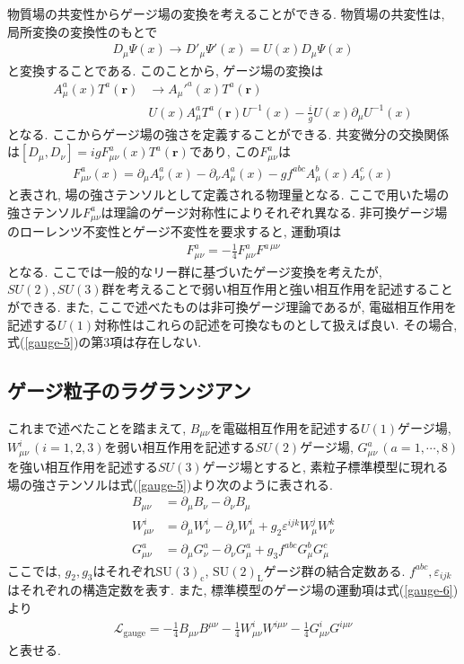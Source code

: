 物質場の共変性からゲージ場の変換を考えることができる.
物質場の共変性は, 局所変換の変換性のもとで
\begin{align}
  D_\mu\Psi(x) \rightarrow D'_\mu \Psi'(x) = U(x) D_\mu \Psi(x)\label{gauge-3}
\end{align}
と変換することである.
このことから, ゲージ場の変換は
\begin{align}
   A_\mu^a(x) T^a(\bm{r}) &\rightarrow A_\mu'^a(x) T^a(\bm{r})\nonumber\\
                          & U(x)A_\mu^a T^a(\bm{r}) U^{-1}(x) -\frac{i}{g}U(x)\partial_\mu U^{-1}(x) \label{gauge-4}
\end{align}
となる.
ここからゲージ場の強さを定義することができる.
共変微分の交換関係は$[D_\mu,D_\nu] = igF_{\mu\nu}^a(x)T^a(\bm{r})$であり, この$F_{\mu\nu}^a$は
\begin{align}
  F_{\mu\nu}^a(x) = \partial_\mu A_\nu^a(x) - \partial_\nu A_\mu^a(x) - gf^{abc}A_\mu^b(x)A_\nu^c(x)\label{gauge-5}
\end{align}
と表され, 場の強さテンソルとして定義される物理量となる.
ここで用いた場の強さテンソル$F_{\mu\nu}^a$は理論のゲージ対称性によりそれぞれ異なる.
非可換ゲージ場のローレンツ不変性とゲージ不変性を要求すると, 運動項は
\begin{align}
  F_{\mu\nu}^a = -\frac{1}{4}F_{\mu\nu}^a F^{a\,\mu\nu}\label{gauge-6}
\end{align}
となる.
ここでは一般的なリー群に基づいたゲージ変換を考えたが, $SU(2), SU(3)$群を考えることで弱い相互作用と強い相互作用を記述することができる.
また, ここで述べたものは非可換ゲージ理論であるが, 電磁相互作用を記述する$U(1)$対称性はこれらの記述を可換なものとして扱えば良い.
その場合, 式(\ref{gauge-5})の第3項は存在しない.
\subsection{ゲージ粒子のラグランジアン}
これまで述べたことを踏まえて, $B_{\mu\nu}$を電磁相互作用を記述する$U(1)$ゲージ場, $W_{\mu\nu}^i\,(i=1,2,3)$を弱い相互作用を記述する$SU(2)$ゲージ場, $G_{\mu\nu}^a\,(a=1,\cdots,8)$を強い相互作用を記述する$SU(3)$ゲージ場とすると, 素粒子標準模型に現れる場の強さテンソルは式(\ref{gauge-5})より次のように表される.
\begin{align}
  B_{\mu\nu} &= \partial_\mu B_\nu - \partial_\nu B_\mu \label{gauge.B}\\
  W_{\mu\nu}^i &= \partial_\mu W_\nu^i - \partial_\nu W_\mu^i+g_2\varepsilon^{ijk}W_\mu^j W_\nu^k \label{gauge.W}\\
  G_{\mu\nu}^a &= \partial_\mu G_\nu^a - \partial_\nu G_\mu^a +g_3 f^{abc}G_\mu^b G_\mu^c\label{gauge.G}
\end{align}
ここでは, $g_2, g_3$はそれぞれ$\mathrm{SU}(3)_\mathrm{c}$, $\mathrm{SU}(2)_\mathrm{L}$ゲージ群の結合定数ある.
$f^{abc}, \varepsilon_{ijk} $はそれぞれの構造定数を表す.
また, 標準模型のゲージ場の運動項は式(\ref{gauge-6})より
\begin{align}
  \mathcal{L}_{\text{gauge}} = -\frac{1}{4}B_{\mu\nu} B^{\mu\nu} - \frac{1}{4}W_{\mu\nu}^i W^{i\mu\nu} -\frac{1}{4}G_{\mu\nu}^i G^{i\mu\nu}\label{gauge.kin}
\end{align}
と表せる.
